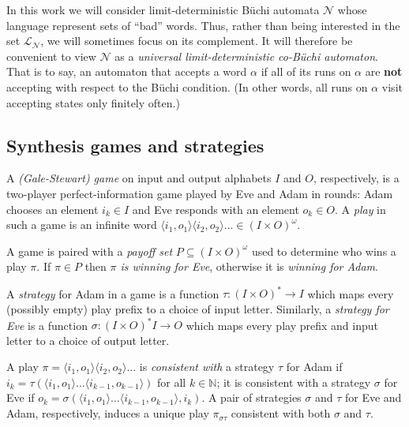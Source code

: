 \documentclass[draft]{llncs}
\newcommand{\eve}{Eve\xspace}
\newcommand{\adam}{Adam\xspace}
\newcommand{\calN}{\mathcal{N}}
\newcommand{\lang}[1]{\mathcal{L}_{#1}}
\newcommand{\out}[2]{\pi_{#1#2}}
\begin{document}
In this work we will consider limit-deterministic B\"uchi automata $\calN$ whose
language represent sets of ``bad'' words. Thus, rather than being interested in
the set $\lang{\calN}$, we will sometimes focus on its complement. It will
therefore be convenient to view $\calN$ as a \emph{universal limit-deterministic
co-B\"uchi automaton}. That is to say, an automaton that accepts a word $\alpha$
if all of its runs on $\alpha$ are \textbf{not} accepting with respect to the
B\"uchi condition. (In other words, all runs on $\alpha$ visit accepting states
only finitely often.)

\subsection{Synthesis games and strategies}
\begin{definition}[Games]
    A \emph{(Gale-Stewart) game} on input and output alphabets $I$ and $O$,
    respectively, is a two-player perfect-information game played by \eve and
    \adam in rounds: \adam chooses an element $i_k \in I$ and \eve responds with
    an element $o_k \in O$. A \emph{play} in such a game is an infinite word
    $\langle i_1, o_1\rangle \langle i_2, o_2\rangle \dots \in (I\times O)^\omega$. 
\end{definition}
A game is paired with a \emph{payoff set} $P \subseteq (I \times
O)^\omega$ used to determine who wins a play $\pi$. If $\pi \in P$ then
\emph{$\pi$ is winning for \eve}, otherwise it is \emph{winning for \adam}.

\begin{definition}[Strategies]
    A \emph{strategy} for \adam in a game is a function $\tau : (I \times O)^*
    \to I$ which maps every (possibly empty) play prefix
    to a choice of input letter.  Similarly, a \emph{strategy for \eve}
    is a function $\sigma : (I \times O)^* I \to O$ which maps every play prefix
    and input letter to a choice of output letter.
\end{definition}
A play $\pi = \langle i_1, o_1\rangle \langle i_2, o_2\rangle \dots$
is \emph{consistent with} a strategy $\tau$
for \adam if $i_k = \tau( \langle i_1, o_1\rangle \dots
\langle i_{k-1}, o_{k-1}\rangle)$ for all $k \in
\mathbb{N}$; it is consistent with a strategy $\sigma$ for \eve if $o_k =
\sigma( \langle i_1, o_1\rangle \dots \langle i_{k-1}, o_{k-1}\rangle, i_{k})$.
A pair of strategies $\sigma$ and $\tau$ for
\eve and \adam, respectively, induces a unique play $\out{\sigma}{\tau}$
consistent with both $\sigma$ and $\tau$.
\end{document}
